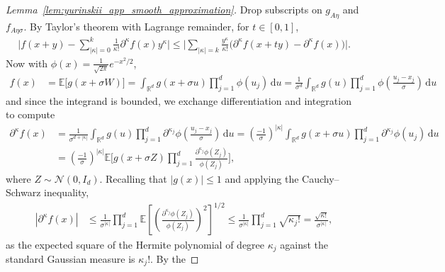 \documentclass[11pt,lof]{puthesis}
\newcommand{\R}{\ensuremath{\mathbb{R}}}
\newcommand{\E}{\ensuremath{\mathbb{E}}}
\newcommand{\cN}{\ensuremath{\mathcal{N}}}
\newcommand{\diff}[1]{\,\mathrm{d}#1}
\theoremstyle{break}
\theoremstyle{proof}
\newtheorem{proof}{Proof}
\begin{document}
\begin{proof}[Lemma~\ref{lem:yurinskii_app_smooth_approximation}]
  Drop subscripts on $g_{A\eta}$ and $f_{A \eta \sigma}$.
  By Taylor's theorem with Lagrange remainder, for $t \in [0,1]$,
  \begin{align*}
    \Bigg|
    f(x + y)
    - \sum_{|\kappa|=0}^{k}
    \frac{1}{\kappa!}
    \partial^{\kappa} f(x)
    y^\kappa
    \Bigg|
    \leq
    \Bigg|
    \sum_{|\kappa|=k}
    \frac{y^\kappa}{\kappa!}
    \big(
      \partial^{\kappa} f(x + t y)
      - \partial^{\kappa} f(x)
    \big)
    \Bigg|.
  \end{align*}
  Now with $\phi(x) = \frac{1}{\sqrt{2 \pi}} e^{-x^2/2}$,
  \begin{align*}
    f(x)
    &=
    \E\big[g(x + \sigma W) \big]
    =
    \int_{\R^d}
    g(x + \sigma u)
    \prod_{j=1}^{d}
    \phi(u_j)
    \diff u
    =
    \frac{1}{\sigma^d}
    \int_{\R^d}
    g(u)
    \prod_{j=1}^{d}
    \phi \left( \frac{u_j-x_j}{\sigma} \right)
    \diff u
  \end{align*}
  and since the integrand is bounded, we exchange differentiation and
  integration to compute
  \begin{align}
    \nonumber
    \partial^\kappa
    f(x)
    &=
    \frac{1}{\sigma^{d+|\kappa|}}
    \int_{\R^d}
    g(u)
    \prod_{j=1}^{d}
    \partial^{\kappa_j}
    \phi \left( \frac{u_j-x_j}{\sigma} \right)
    \diff u
    = \left( \frac{-1}{\sigma} \right)^{|\kappa|}
    \int_{\R^d}
    g(x + \sigma u)
    \prod_{j=1}^{d}
    \partial^{\kappa_j}
    \phi(u_j)
    \diff u \\
    \label{eq:yurinskii_app_smoothing_derivative}
    &=
    \left( \frac{-1}{\sigma} \right)^{|\kappa|}
    \E \Bigg[
      g(x + \sigma Z)
      \prod_{j=1}^{d}
      \frac{\partial^{\kappa_j}\phi(Z_j)}{\phi(Z_j)}
    \Bigg],
  \end{align}
  where $Z \sim \cN(0, I_d)$.
  Recalling that $|g(x)| \leq 1$ and applying the Cauchy--Schwarz inequality,
  \begin{align*}
    \left|
    \partial^\kappa
    f(x)
    \right|
    &\leq
    \frac{1}{\sigma^{|\kappa|}}
    \prod_{j=1}^{d}
    \E \left[
      \left(
        \frac{\partial^{\kappa_j}\phi(Z_j)}{\phi(Z_j)}
      \right)^2
    \right]^{1/2}
    \leq
    \frac{1}{\sigma^{|\kappa|}}
    \prod_{j=1}^{d}
    \sqrt{\kappa_j!}
    =
    \frac{\sqrt{\kappa!}}{\sigma^{|\kappa|}},
  \end{align*}
  as the expected square of the Hermite polynomial of degree
  $\kappa_j$ against the standard Gaussian measure is $\kappa_j!$. By the

\end{proof}
\end{document}
